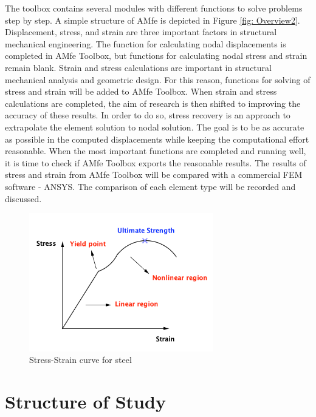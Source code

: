 The toolbox contains several modules with different functions to solve problems step by step. A simple structure of AMfe is depicted in Figure \ref{fig: Overview2}. Displacement, stress, and strain are three important factors in structural mechanical engineering. The function for calculating nodal displacements is completed in AMfe Toolbox, but functions for calculating nodal stress and strain remain blank. Strain and stress calculations are important in structural mechanical analysis and geometric design. For this reason, functions for solving of stress and strain will be added to AMfe Toolbox. When strain and stress calculations are completed, the aim of research is then shifted to improving the accuracy of these results. In order to do so, stress recovery is an approach to extrapolate the element solution to nodal solution. The goal is to be as accurate as possible in the computed displacements while keeping the computational effort reasonable. When the most important functions are completed and running well, it is time to check if AMfe Toolbox exports the reasonable results. The results of stress and strain from AMfe Toolbox will be compared with a commercial FEM software - ANSYS. The comparison of each element type will be recorded and discussed. 

\begin{figure}
	\begin{center}
		\includegraphics[width=8cm,clip]{nonlinear.pdf}			
		\caption{Stress-Strain curve for steel} \label{fig: nonlinear}
	\end{center}
\end{figure}

\section{Structure of Study}

